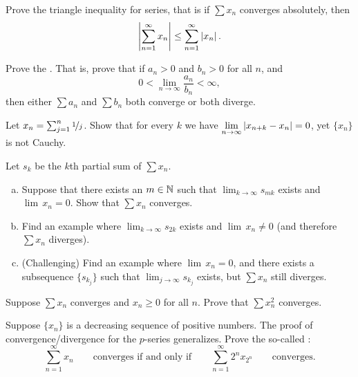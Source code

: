 \begin{exercise}
Prove the triangle inequality for series, that is
if $\sum x_n$ converges absolutely, then
\begin{equation*}
\left\lvert {\sum_{n=1}^\infty x_n} \right\rvert \leq
\sum_{n=1}^\infty \left\lvert {x_n} \right\rvert .
\end{equation*}
\end{exercise}

\begin{exercise}
Prove the \emph{}.  That is, prove that if
$a_n > 0$ and $b_n > 0$ for all $n$, and
\begin{equation*}
0 < \lim_{n\to\infty} \frac{a_n}{b_n} < \infty ,
\end{equation*}
then either $\sum a_n$ and $\sum b_n$ both converge or both diverge.
\end{exercise}

\begin{exercise} \label{exercise:badnocauchy}
Let $x_n = \sum_{j=1}^n \nicefrac{1}{j}$.  Show that for every $k$
we have
$\displaystyle \lim_{n\to\infty} \left\lvert {x_{n+k}-x_n} \right\rvert = 0$, yet $\{ x_n \}$ is not Cauchy.
\end{exercise}

\begin{samepage}
\begin{exercise}
Let $s_k$ be the $k$th partial sum of $\sum x_n$.
\begin{enumerate}[a)]
\item
Suppose that there exists an $m \in {\mathbb{N}}$ such that $\displaystyle \lim_{k\to\infty}
s_{mk}$ exists and $\lim\, x_n = 0$.  Show that $\sum x_n$ converges.
\item
Find an example where $\displaystyle \lim_{k\to\infty} s_{2k}$ exists and
$\lim\, x_n \not= 0$ (and therefore $\sum x_n$ diverges).
\item
(Challenging) Find an example where $\lim\, x_n = 0$, and there exists
a subsequence $\{ s_{k_j} \}$ such that $\displaystyle \lim_{j\to\infty} s_{k_j}$ exists,
but $\sum x_n$ still diverges.
\end{enumerate}
\end{exercise}
\end{samepage}

\begin{exercise} \label{exercise:squareseriesconv}
Suppose $\sum x_n$ converges and $x_n \geq 0$ for all $n$.  Prove that $\sum x_n^2$ converges.
\end{exercise}

\begin{exercise}[Challenging] \label{exercise:cauchycondensation}
Suppose $\{ x_n\}$ is a decreasing sequence of positive numbers.
The proof of convergence/divergence for the $p$-series generalizes.
Prove the so-called 
\emph{}:
\begin{equation*}
\sum_{n=1}^\infty x_n
\qquad \text{converges if and only if} \qquad
\sum_{n=1}^\infty 2^n x_{2^n} \qquad \text{converges}.
\end{equation*}
\end{exercise}

